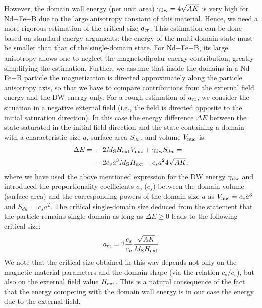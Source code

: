 \documentclass[prm,twocolumn,showkeys,preprintnumbers,amsmath,amssymb,superscriptaddress,aps,10pt]{revtex4-1}
\begin{document}
However, the domain wall energy (per unit area) $\gamma_{\rm dw} = 4 \sqrt{A K}$ is very high for Nd$-$Fe$-$B due to the large anisotropy constant of this material. Hence, we need a more rigorous estimation of the critical size $a_{\rm cr}$. This estimation can be done based on standard energy arguments: the energy of the multi-domain state must be smaller than that of the single-domain state. For Nd$-$Fe$-$B, its large anisotropy allows one to neglect the magnetodipolar energy contribution, greatly simplifying the estimation. Further, we assume that inside the domains in a Nd$-$Fe$-$B particle the magnetization is directed approximately along the particle anisotropy axis, so that we have to compare contributions from the external field energy and the DW energy only. For a rough estimation of $a_{\rm cr}$, we consider the situation in a negative external field (i.e., the field is directed opposite to the initial saturation direction). In this case the energy difference $\Delta E$ between the state saturated in the initial field direction and the state containing a domain with a characteristic size $a$, surface area $S_{dw}$, and volume $V_{\rm nuc}$ is
\begin{equation}
\label{DeltaE}
\begin{aligned}
\Delta E = {} & -2 M_{\rm S} H_{\rm ext} V_{\rm nuc} + \gamma_{\rm dw} S_{dw} = \\
&  -2 c_v a^3 M_{\rm S} H_{\rm ext} + c_s a^2 4 \sqrt{A K},
\end{aligned}
\end{equation}
where we have used the above mentioned expression for the DW energy $\gamma_{\rm dw}$ and introduced the proportionality coefficients $c_v$ ($c_s$) between the domain volume (surface area) and the corresponding powers of the domain size $a$ as $V_{\rm nuc} = c_v a^3$ and $S_{dw} = c_s a^2$. The critical single-domain size deduced from the statement that the particle remains single-domain as long as $\Delta E \ge 0$ leads to the following critical size:
\begin{equation}
\label{CritSize1}
a_{\rm cr} = 2 \frac{c_s}{c_v} \frac{\sqrt{A K}}{M_{\rm S} H_{\rm ext}}
\end{equation}
We note that the critical size obtained in this way depends not only on the magnetic material parameters and the domain shape (via the relation $c_s/c_v$), but also on the external field value $H_{\rm ext}$. This is a natural consequence of the fact that the energy competing with the domain wall energy is in our case the energy due to the external field.
\end{document}
